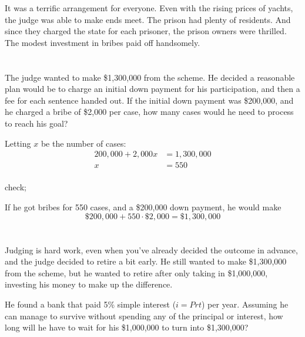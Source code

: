 \documentclass[letterpaper, landscape]{exam}
\begin{document}
\begin{questions}
      It was a terrific arrangement for everyone.  Even with the rising prices of yachts, the judge was able to make
      ends meet.  The prison had plenty of residents.  And since they charged the state for each prisoner, the prison
      owners were thrilled. The modest investment in bribes paid off handsomely.

      \begin{parts}
        \part{}
          The judge wanted to make \$1,300,000 from the scheme.  He decided a reasonable plan would be to charge an
          initial down payment for his participation, and then a fee for each sentence handed out.  If the initial down
          payment was \$200,000, and he charged a bribe of \$2,000 per case, how many cases would he need to process to
          reach his goal?

          \begin{solution}
            Letting $x$ be the number of cases:
            \begin{align*}
              200,000 + 2,000x & = 1,300,000 \\
              x                & = \boxed{ 550 } \\
            \end{align*}

            check; 
            
            If he got bribes for 550 cases, and a \$200,000 down payment, he would make 
            \[
              \$200,000 + 550 \cdot \$2,000 = \$1,300,000
            \]
          \end{solution}

        \part{}
          Judging is hard work, even when you've already decided the outcome in advance, and the judge decided to retire
          a bit early.  He still wanted to make \$1,300,000 from the scheme, but he wanted to retire after only taking
          in \$1,000,000, investing his money to make up the difference.  

          He found a bank that paid 5\% simple interest ($i = Prt$) per year. Assuming he can manage to survive without
          spending any of the principal or interest, how long will he have to wait for his \$1,000,000 to turn into
          \$1,300,000?


\end{parts}
\end{questions}
\end{document}
